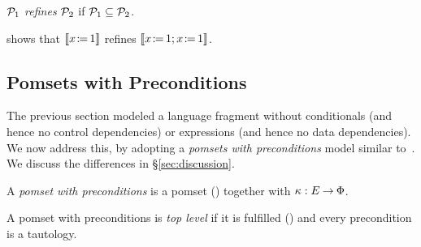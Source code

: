 \begin{definition}
  $\mathcal{P}_1$ \emph{refines} $\mathcal{P}_2$ if $\mathcal{P}_1\subseteq\mathcal{P}_2$.
\end{definition}

\begin{example}
   shows that $\sem{\PW{x}{1}}$ refines $\sem{\PW{x}{1}\SEMI\PW{x}{1}}$.
\end{example}

\subsection{Pomsets with Preconditions}
\label{sec:pomsets-pre}

The previous section modeled a language fragment without conditionals (and hence no
control dependencies) or expressions (and hence no data dependencies). We now
address this, by adopting a \emph{pomsets with preconditions} model
similar to~\cite{DBLP:journals/pacmpl/JagadeesanJR20}.
We discuss the differences in \S\ref{sec:discussion}.

\begin{definition}
  A \emph{pomset with preconditions} is
  a pomset () together with $\kappa:E\mathbin\rightarrow\Phi$.
\end{definition}

\begin{definition}
  A pomset with preconditions is \emph{top level} if it is fulfilled () and
  every precondition is a tautology.
\end{definition}


